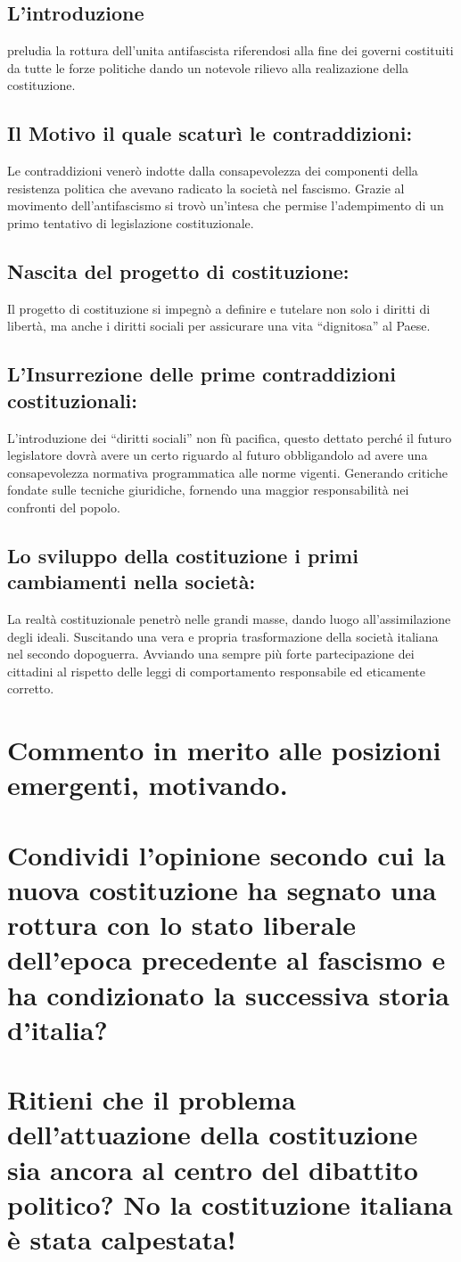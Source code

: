 \documentclass{article}
\begin{document}
\subsection{L'introduzione}preludia la rottura dell’unita antifascista riferendosi alla fine dei governi costituiti da tutte le forze politiche dando un notevole rilievo alla realizazione della costituzione.
\subsection{Il Motivo il quale scaturì le contraddizioni:}
Le contraddizioni  venerò indotte dalla consapevolezza dei componenti della resistenza politica che avevano radicato la società nel fascismo.
Grazie al movimento dell’antifascismo si trovò un’intesa che permise 
l’adempimento di un primo tentativo di legislazione costituzionale.
\subsection{Nascita del progetto di costituzione:}
Il progetto di costituzione si impegnò a definire e tutelare non solo i diritti di libertà, ma anche i diritti sociali per assicurare una vita “dignitosa” al Paese.
\subsection{L’Insurrezione delle prime contraddizioni costituzionali:}
L’introduzione dei “diritti sociali” non fù pacifica, questo dettato perché il futuro legislatore dovrà avere un certo riguardo al futuro obbligandolo ad avere una consapevolezza normativa programmatica alle norme vigenti. Generando critiche fondate sulle tecniche giuridiche, fornendo una maggior responsabilità nei confronti del popolo.
\subsection{ Lo sviluppo della costituzione i primi cambiamenti nella società:}
La realtà costituzionale penetrò nelle grandi masse, dando luogo all'assimilazione degli ideali.
Suscitando una vera e propria trasformazione della società italiana nel secondo dopoguerra. Avviando una sempre più forte partecipazione dei cittadini al rispetto delle leggi di comportamento responsabile ed eticamente corretto.
\section{Commento in merito alle posizioni emergenti, motivando.}
\section{Condividi l'opinione secondo cui la nuova costituzione ha segnato una rottura con lo stato liberale dell'epoca precedente al fascismo e ha condizionato la successiva storia d'italia?}
\section{Ritieni che il problema dell’attuazione della costituzione sia ancora al centro del dibattito politico?
No la costituzione italiana è stata calpestata!}
\end{document}
